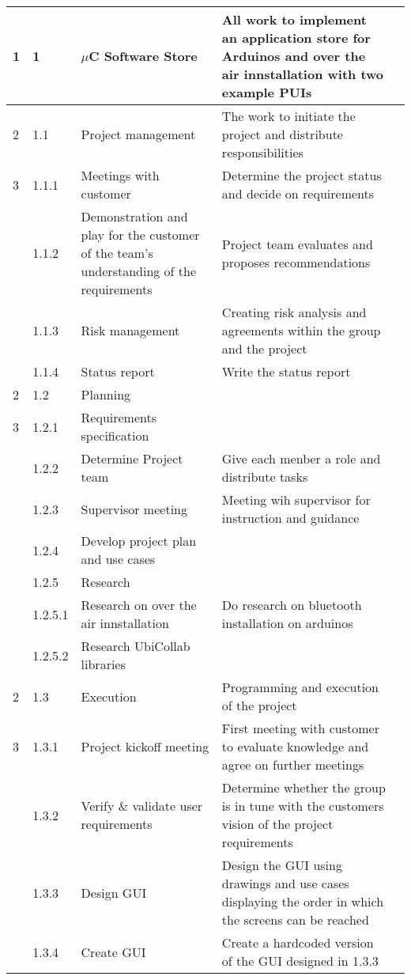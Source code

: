 \begin{longtable}{|m{}|m{}|m{}|m{}|m{}|}
	1 & 1 & $\mu$C Software Store & All work to implement an application store for Arduinos and over the air innstallation with two example PUIs & \\
\hline
	2 & 1.1 & Project management & The work to initiate the project and distribute responsibilities & \\
\hline
	3 & 1.1.1 & Meetings with customer & Determine the project status and decide on requirements & \\
\hline
	 & 1.1.2 & Demonstration and play for the customer of the team's understanding of the requirements & Project team evaluates and proposes recommendations & \\
\hline
	 & 1.1.3 & Risk management & Creating risk analysis and agreements within the group and the project & \\
\hline
	 & 1.1.4 & Status report & Write the status report & \\
\hline
	2 & 1.2 & Planning & & \\
\hline
	3 & 1.2.1 & Requirements specification & & \\
\hline
	 & 1.2.2 & Determine Project team & Give each menber a role and distribute tasks & \\
\hline
	 & 1.2.3 & Supervisor meeting & Meeting wih supervisor for instruction and guidance & \\
\hline
	 & 1.2.4 & Develop project plan and use cases & & \\
\hline
	 & 1.2.5 & Research & & \\
\hline
	 & 1.2.5.1 & Research on over the air innstallation & Do research on bluetooth installation on arduinos & \\
\hline
	 & 1.2.5.2 & Research UbiCollab libraries & & \\
\hline
	2 & 1.3 & Execution & Programming and execution of the project & \\
\hline
	3 & 1.3.1 & Project kickoff meeting & First meeting with customer to evaluate knowledge and agree on further meetings & \\
\hline
	 & 1.3.2 & Verify \& validate user requirements & Determine whether the group is in tune with the customers vision of the project requirements & \\
\hline
	 & 1.3.3 & Design GUI & Design the GUI using drawings and use cases displaying the order in which the screens can be reached & \\
\hline	  
	 & 1.3.4 & Create GUI & Create a hardcoded version of the GUI designed in 1.3.3 & \\

\end{longtable}
